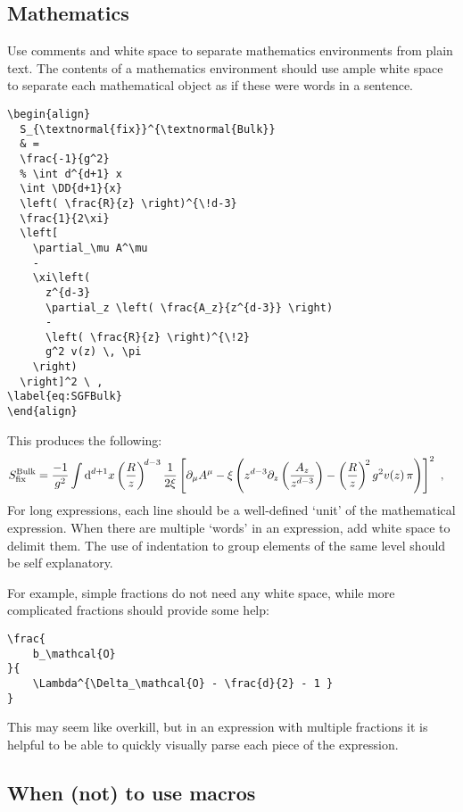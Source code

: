 \subsection{Mathematics}

Use comments and white space to separate mathematics environments from plain text.
% 
The contents of a mathematics environment should use ample white space to separate each mathematical object as if these were words in a sentence.
% 
\begin{lstlisting}[style=latexstyle]
\begin{align}
  S_{\textnormal{fix}}^{\textnormal{Bulk}}
  & =
  \frac{-1}{g^2} 
  % \int d^{d+1} x  
  \int \DD{d+1}{x}
  \left( \frac{R}{z} \right)^{\!d-3}
  \frac{1}{2\xi}
  \left[
    \partial_\mu A^\mu
    -
    \xi\left( 
      z^{d-3} 
      \partial_z \left( \frac{A_z}{z^{d-3}} \right)
      -
      \left( \frac{R}{z} \right)^{\!2} 
      g^2 v(z) \, \pi
    \right)
  \right]^2 \ ,
\label{eq:SGFBulk}
\end{align}
\end{lstlisting}
% 
This produces the following:
\begin{align}
	S_{\textnormal{fix}}^{\textnormal{Bulk}}
	& =
	\frac{-1}{g^2} 
	\int \operatorname{d}^{d+1}\!{x}  
	\left( \frac{R}{z} \right)^{\!d-3}\frac{1}{2\xi}
	\left[
	    \partial_\mu A^\mu
	    -
	    \xi\left( 
	        z^{d-3} \partial_z \left(\frac{A_z}{z^{d-3}}\right)
	        -
	        \left(\frac{R}{z}\right)^{\!2} g^2 v(z)\, \pi
	    \right)
	\right]^2 \ ,
\end{align}
For long expressions, each line should be a well-defined `unit' of the mathematical expression. When there are multiple `words' in an expression, add white space to delimit them. The use of indentation to group elements of the same level should be self explanatory.

For example, simple fractions do not need any white space, while more complicated fractions should provide some help:
% 
\begin{lstlisting}[style=latexstyle]
\frac{ 
	b_\mathcal{O}
}{
	\Lambda^{\Delta_\mathcal{O} - \frac{d}{2} - 1 }
} 
\end{lstlisting}
% 
This may seem like overkill, but in an expression with multiple fractions it is helpful to be able to quickly visually parse each piece of the expression.


\subsection{When (not) to use macros}

